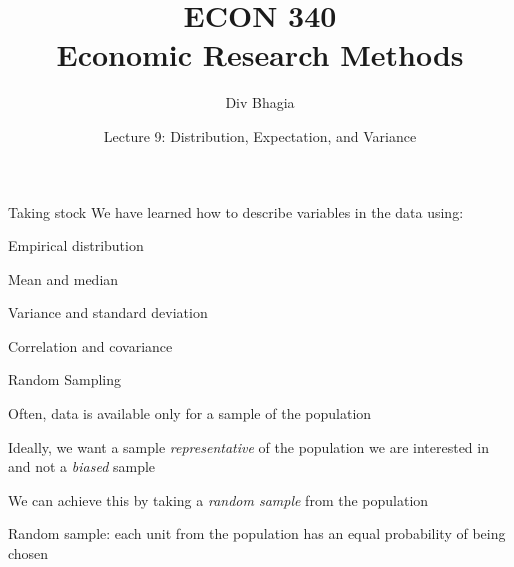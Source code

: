 \documentclass{./../div_teaching_slides}
\begin{document}
\title{ECON 340 \\ Economic Research Methods}
\author{Div Bhagia}
\date{Lecture 9: Distribution, Expectation, and Variance}

\begin{frame}
\maketitle
\end{frame}

\begin{frame}{Taking stock}
We have learned how to describe variables in the data using: \\ \vspace{0.5em}

\begin{witemize}
\item Empirical distribution 
\item Mean and median
\item Variance and standard deviation
\item Correlation and covariance
\end{witemize}
\end{frame}

\begin{frame}{Random Sampling}
\begin{witemize}
\item Often, data is available only for a sample of the population
\item Ideally, we want a sample \textit{representative} of the population we are interested in and not a \textit{biased} sample
\item We can achieve this by taking a \textit{random sample} from the population 
\item Random sample: each unit from the population has an equal probability of being chosen
\end{witemize}
\end{frame}
\end{document}
